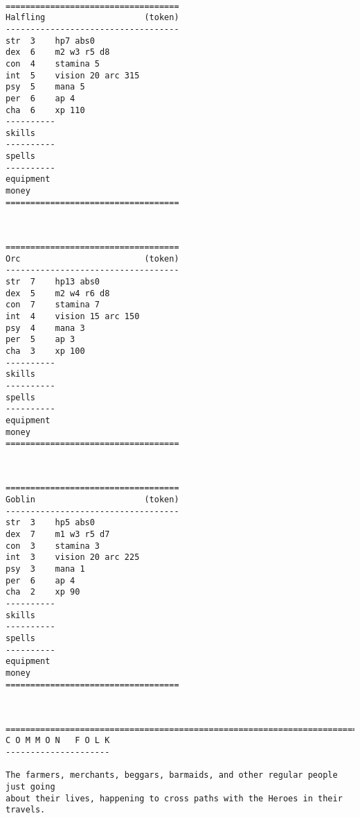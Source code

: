 \

\goodbreak \small \begin{samepage} \begin{verbatim}
===================================
Halfling                    (token)
-----------------------------------
str  3    hp7 abs0
dex  6    m2 w3 r5 d8
con  4    stamina 5
int  5    vision 20 arc 315
psy  5    mana 5
per  6    ap 4
cha  6    xp 110
----------
skills
----------
spells
----------
equipment
money
===================================
\end{verbatim} \end{samepage} \normalsize

\

\goodbreak \small \begin{samepage} \begin{verbatim}
===================================
Orc                         (token)
-----------------------------------
str  7    hp13 abs0
dex  5    m2 w4 r6 d8
con  7    stamina 7
int  4    vision 15 arc 150
psy  4    mana 3
per  5    ap 3
cha  3    xp 100
----------
skills
----------
spells
----------
equipment
money
===================================
\end{verbatim} \end{samepage} \normalsize

\

\goodbreak \small \begin{samepage} \begin{verbatim}
===================================
Goblin                      (token)
-----------------------------------
str  3    hp5 abs0
dex  7    m1 w3 r5 d7
con  3    stamina 3
int  3    vision 20 arc 225
psy  3    mana 1
per  6    ap 4
cha  2    xp 90
----------
skills
----------
spells
----------
equipment
money
===================================
\end{verbatim} \end{samepage} \normalsize

\









\goodbreak
{}


\goodbreak \begin{samepage} \small \begin{verbatim}
================================================================================
C O M M O N   F O L K
---------------------

The farmers, merchants, beggars, barmaids, and other regular people just going
about their lives, happening to cross paths with the Heroes in their travels.
\end{verbatim} \normalsize \end{samepage}

